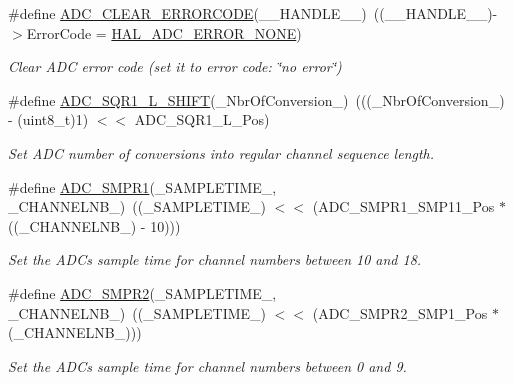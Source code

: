 \begin{DoxyCompactItemize}
\#define \hyperlink{group___a_d_c___private___macros_gac7ab87a3ab932eed1b3ac5faad4e3aa9}{A\+D\+C\+\_\+\+C\+L\+E\+A\+R\+\_\+\+E\+R\+R\+O\+R\+C\+O\+DE}(\+\_\+\+\_\+\+H\+A\+N\+D\+L\+E\+\_\+\+\_\+)~((\+\_\+\+\_\+\+H\+A\+N\+D\+L\+E\+\_\+\+\_\+)-\/$>$Error\+Code = \hyperlink{group___a_d_c___error___code_ga93b4576d46ee0f8c53b7d69f39778e38}{H\+A\+L\+\_\+\+A\+D\+C\+\_\+\+E\+R\+R\+O\+R\+\_\+\+N\+O\+NE})
\begin{DoxyCompactList}\small\item\em Clear A\+DC error code (set it to error code\+: \char`\"{}no error\char`\"{}) \end{DoxyCompactList}\item 
\#define \hyperlink{group___a_d_c___private___macros_ga2b29c0e46fa4205f77b15fe7c3425fb8}{A\+D\+C\+\_\+\+S\+Q\+R1\+\_\+\+L\+\_\+\+S\+H\+I\+FT}(\+\_\+\+Nbr\+Of\+Conversion\+\_\+)~(((\+\_\+\+Nbr\+Of\+Conversion\+\_\+) -\/ (uint8\+\_\+t)1) $<$$<$ A\+D\+C\+\_\+\+S\+Q\+R1\+\_\+\+L\+\_\+\+Pos)
\begin{DoxyCompactList}\small\item\em Set A\+DC number of conversions into regular channel sequence length. \end{DoxyCompactList}\item 
\#define \hyperlink{group___a_d_c___private___macros_ga29f7414128fbbdb81db6ea6ede449f4b}{A\+D\+C\+\_\+\+S\+M\+P\+R1}(\+\_\+\+S\+A\+M\+P\+L\+E\+T\+I\+M\+E\+\_\+,  \+\_\+\+C\+H\+A\+N\+N\+E\+L\+N\+B\+\_\+)~((\+\_\+\+S\+A\+M\+P\+L\+E\+T\+I\+M\+E\+\_\+) $<$$<$ (A\+D\+C\+\_\+\+S\+M\+P\+R1\+\_\+\+S\+M\+P11\+\_\+\+Pos $\ast$ ((\+\_\+\+C\+H\+A\+N\+N\+E\+L\+N\+B\+\_\+) -\/ 10)))
\begin{DoxyCompactList}\small\item\em Set the A\+DC\textquotesingle{}s sample time for channel numbers between 10 and 18. \end{DoxyCompactList}\item 
\#define \hyperlink{group___a_d_c___private___macros_gaeb66714538d978d4d336a4a6ef0d58bc}{A\+D\+C\+\_\+\+S\+M\+P\+R2}(\+\_\+\+S\+A\+M\+P\+L\+E\+T\+I\+M\+E\+\_\+,  \+\_\+\+C\+H\+A\+N\+N\+E\+L\+N\+B\+\_\+)~((\+\_\+\+S\+A\+M\+P\+L\+E\+T\+I\+M\+E\+\_\+) $<$$<$ (A\+D\+C\+\_\+\+S\+M\+P\+R2\+\_\+\+S\+M\+P1\+\_\+\+Pos $\ast$ (\+\_\+\+C\+H\+A\+N\+N\+E\+L\+N\+B\+\_\+)))
\begin{DoxyCompactList}\small\item\em Set the A\+DC\textquotesingle{}s sample time for channel numbers between 0 and 9. \end{DoxyCompactList}\item 
$$
\end{DoxyCompactItemize}
